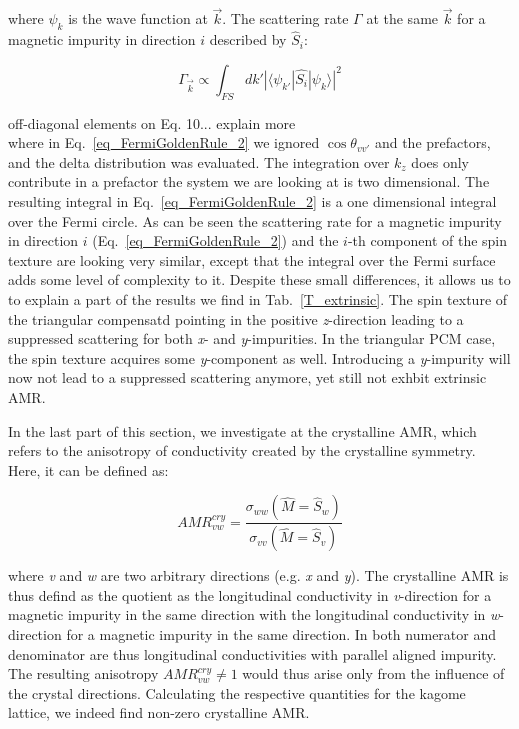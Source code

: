 \documentclass[prb,showpacs,amsmath,amssymb,superscriptaddress,twocolumn,floatfix]{revtex4-1}
\begin{document}
where $\psi_k$ is the wave function at $\vec{k}$. The scattering rate $\Gamma$ at the same $\vec{k}$ for a magnetic impurity in direction $i$ described by $\hat{S}_i$:

\begin{equation}	
	{\Gamma_{\vec{k}}} \propto \int_{FS} dk' |\langle \psi_{k'} |\hat{S_i}|\psi_k \rangle|^2
	\label{eq_FermiGoldenRule_2}
\end{equation}

{\color{red} off-diagonal elements on Eq. 10... explain more}\\
where in Eq.~\ref{eq_FermiGoldenRule_2} we ignored $\cos \theta_{vv'}$ and the prefactors, and the delta distribution was evaluated. The integration over $k_z$ does only contribute in a prefactor the system we are looking at is two dimensional. The resulting integral in Eq.~\ref{eq_FermiGoldenRule_2} is a one dimensional integral over the Fermi circle. As can be seen the scattering rate for a magnetic impurity in direction $i$ (Eq.~\ref{eq_FermiGoldenRule_2}) and the $i$-th component of the spin texture are looking very similar, except that the integral over the Fermi surface adds some level of complexity to it. Despite these small differences, it allows us to to explain a part of the results we find in Tab.~\ref{T_extrinsic}. The spin texture of the triangular compensatd pointing in the positive \textit{z}-direction leading to a suppressed scattering for both \textit{x}- and \textit{y}-impurities. In the triangular PCM case, the spin texture acquires some \textit{y}-component as well. Introducing a \textit{y}-impurity will now not lead to a suppressed scattering anymore, yet still not exhbit extrinsic AMR.

In the last part of this section, we investigate at the crystalline AMR, which refers to the anisotropy of conductivity created by the crystalline symmetry. Here, it can be defined as:

\begin{equation}
	AMR^{cry}_{vw} = \frac{\sigma_{ww} (\hat{M} = \hat{S}_w)}{\sigma_{vv} (\hat{M} = \hat{S}_v)}
\end{equation}

where \textit{v} and \textit{w} are two arbitrary directions (e.g. \textit{x} and \textit{y}). The crystalline AMR is thus defind as the quotient as the longitudinal conductivity in \textit{v}-direction for a magnetic impurity in the same direction with the longitudinal conductivity in \textit{w}-direction for a magnetic impurity in the same direction. In both numerator and denominator are thus longitudinal conductivities with parallel aligned impurity. The resulting anisotropy $AMR^{cry}_{vw} \neq 1$ would thus arise only from the influence of the crystal directions. Calculating the respective quantities for the kagome lattice, we indeed find non-zero crystalline AMR.
\end{document}
